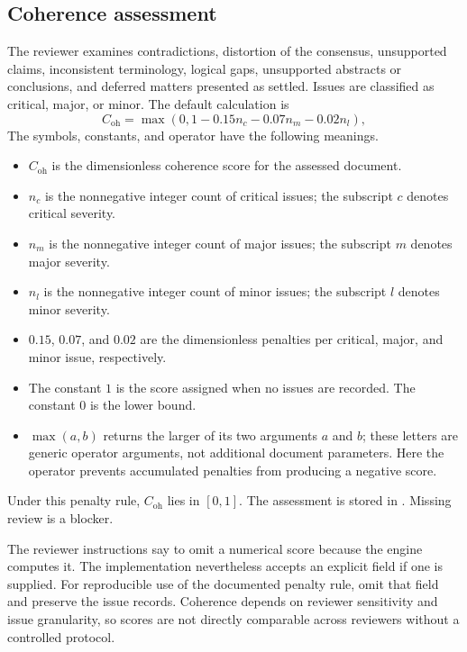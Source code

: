 \documentclass[12pt,a4paper]{article}
\newcommand{\code}[1]{\texttt{\detokenize{#1}}}
\begin{document}
\subsection{Coherence assessment}
The reviewer examines contradictions, distortion of the consensus, unsupported claims, inconsistent terminology, logical gaps, unsupported abstracts or conclusions, and deferred matters presented as settled. Issues are classified as critical, major, or minor. The default calculation is
\begin{equation}
 C_{\mathrm{oh}}=\max(0,1-0.15n_c-0.07n_m-0.02n_l),
\end{equation}
The symbols, constants, and operator have the following meanings.
\begin{itemize}
\item $C_{\mathrm{oh}}$ is the dimensionless coherence score for the assessed document.
\item $n_c$ is the nonnegative integer count of critical issues; the subscript $c$ denotes critical severity.
\item $n_m$ is the nonnegative integer count of major issues; the subscript $m$ denotes major severity.
\item $n_l$ is the nonnegative integer count of minor issues; the subscript $l$ denotes minor severity.
\item $0.15$, $0.07$, and $0.02$ are the dimensionless penalties per critical, major, and minor issue, respectively.
\item The constant $1$ is the score assigned when no issues are recorded. The constant $0$ is the lower bound.
\item $\max(a,b)$ returns the larger of its two arguments $a$ and $b$; these letters are generic operator arguments, not additional document parameters. Here the operator prevents accumulated penalties from producing a negative score.
\end{itemize}
Under this penalty rule, $C_{\mathrm{oh}}$ lies in $[0,1]$. The assessment is stored in \code{quality/coherence.json}. Missing review is a blocker.

The reviewer instructions say to omit a numerical score because the engine computes it. The implementation nevertheless accepts an explicit \code{score} field if one is supplied. For reproducible use of the documented penalty rule, omit that field and preserve the issue records. Coherence depends on reviewer sensitivity and issue granularity, so scores are not directly comparable across reviewers without a controlled protocol.
\end{document}
